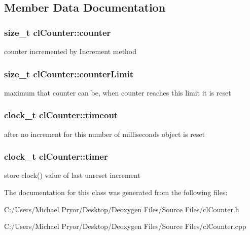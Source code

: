 \subsection{Member Data Documentation}
\hypertarget{classcl_counter_af04adc8de643f218ad5e4b5ecefa676f}{
\subsubsection[{counter}]{\setlength{\rightskip}{0pt plus 5cm}size\_\-t {\bf clCounter::counter}}}
\label{classcl_counter_af04adc8de643f218ad5e4b5ecefa676f}
counter incremented by Increment method \hypertarget{classcl_counter_aa16f1572cf9580b6c699943d678a30fc}{
\subsubsection[{counterLimit}]{\setlength{\rightskip}{0pt plus 5cm}size\_\-t {\bf clCounter::counterLimit}}}
\label{classcl_counter_aa16f1572cf9580b6c699943d678a30fc}
maximum that counter can be, when counter reaches this limit it is reset \hypertarget{classcl_counter_a68b6f9e1cef533810d5cfff1cdffa35a}{
\subsubsection[{timeout}]{\setlength{\rightskip}{0pt plus 5cm}clock\_\-t {\bf clCounter::timeout}}}
\label{classcl_counter_a68b6f9e1cef533810d5cfff1cdffa35a}
after no increment for this number of milliseconds object is reset \hypertarget{classcl_counter_ab4657d871c04c73f93cfb223401ee6f4}{
\subsubsection[{timer}]{\setlength{\rightskip}{0pt plus 5cm}clock\_\-t {\bf clCounter::timer}}}
\label{classcl_counter_ab4657d871c04c73f93cfb223401ee6f4}
store clock() value of last unreset increment 

The documentation for this class was generated from the following files:\begin{DoxyCompactItemize}
\item 
C:/Users/Michael Pryor/Desktop/Deoxygen Files/Source Files/clCounter.h\item 
C:/Users/Michael Pryor/Desktop/Deoxygen Files/Source Files/clCounter.cpp\end{DoxyCompactItemize}
